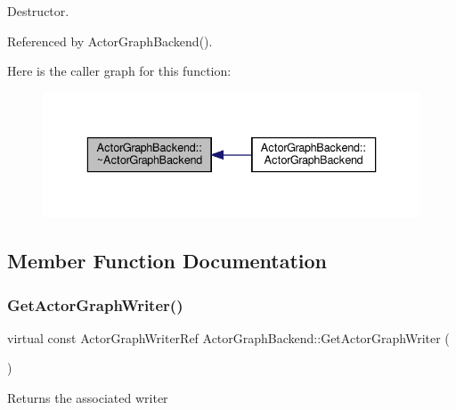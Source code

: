 Destructor. 



Referenced by Actor\+Graph\+Backend().

Here is the caller graph for this function\+:
\nopagebreak
\begin{figure}[H]
\begin{center}
\leavevmode
\includegraphics[width=336pt]{d7/d92/classActorGraphBackend_a135a6332855ab9bd0167d62df1d584a3_icgraph}
\end{center}
\end{figure}


\subsection{Member Function Documentation}
\mbox{\label{classActorGraphBackend_a33020a6f87233b51a860d21be668d9b4}} 
\subsubsection{\texorpdfstring{Get\+Actor\+Graph\+Writer()}{GetActorGraphWriter()}}
{\footnotesize\ttfamily virtual const Actor\+Graph\+Writer\+Ref Actor\+Graph\+Backend\+::\+Get\+Actor\+Graph\+Writer (\begin{DoxyParamCaption}{ }\end{DoxyParamCaption})\hspace{0.3cm}{\ttfamily [pure virtual]}}

\begin{DoxyReturn}{Returns}
the associated writer 
\end{DoxyReturn}
\mbox{\label{classActorGraphBackend_a600bc1bcaf20114fc1c671d7f1f08e1b}} 
